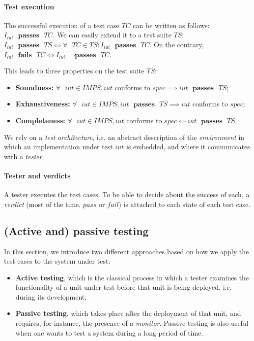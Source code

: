 \paragraph{Test execution} The successful execution of a test
case $TC$ can be written as follows: $I_{iut} \text{ }
\mathbf{passes} \text{ } TC$. We can easily extend it to a test
suite $TS$: $I_{iut} \text{ } \mathbf{passes} \text{ } TS
\Leftrightarrow \forall \text{ } TC \in TS : I_{iut} \text{ }
\mathbf{passes} \text{ } TC$. On the contrary, $I_{iut} \text{ }
\mathbf{fails} \text{ } TC \Leftrightarrow I_{iut} \text{ } \neg
\mathbf{passes} \text{ } TC$.

This leads to three properties on the test suite $TS$:

\begin{itemize}
\item \textbf{Soundness:} $\forall \text{ } iut \in IMPS, iut$
conforms to $spec \implies iut \text{ } \mathbf{passes} \text{ }
TS$;

\item \textbf{Exhaustiveness:} $\forall \text{ } iut \in IMPS,
iut \text{ } \mathbf{passes} \text{ } TS \implies iut$ conforms
to $spec$;

\item \textbf{Completeness:} $\forall \text{ } iut \in IMPS, iut$
conforms to $spec \Leftrightarrow iut \text{ } \mathbf{passes}
\text{ } TS$.
\end{itemize}

We rely on a \textit{test architecture}, i.e. an abstract
description of the \textit{environment} in which an
implementation under test $iut$ is embedded, and where it
communicates with a \textit{tester}.

\paragraph{Tester and verdicts} A tester executes the test cases.
To be able to decide about the success of each, a
\textit{verdict} (most of the time, $pass$ or $fail$) is attached
to each state of each test case.


\subsection{(Active and) passive testing}

In this section, we introduce two different approaches based on
how we apply the test cases to the system under test:

\begin{itemize}
    \item \textbf{Active testing}, which is the classical process
        in which a tester examines the functionality of a unit
        under test before that unit is being deployed, i.e.
        during its development;

    \item \textbf{Passive testing}, which takes place after the
        deployment of that unit, and requires, for instance, the
        presence of a \textit{monitor}. Passive testing is also
        useful when one wants to test a system during a long
        period of time.
\end{itemize}

